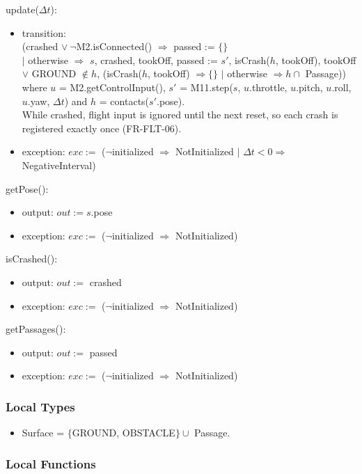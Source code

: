 \documentclass[12pt, titlepage]{article}
\newcommand{\noinit}{$\neg$initialized $\Rightarrow$ NotInitialized}
\begin{document}
\noindent update($\Delta t$):
\begin{itemize}
\item transition: \\
  (crashed $\vee\ \neg$M2.isConnected() $\Rightarrow$ passed := $\{\}$ \\
  $|$ otherwise $\Rightarrow$ $s$, crashed, tookOff, passed := $s'$,
  isCrash($h$, tookOff), tookOff $\vee$ GROUND $\notin h$, (isCrash($h$,
  tookOff) $\Rightarrow \{\}$ $|$ otherwise $\Rightarrow h \cap$ Passage)) \\
  where $u$ = M2.getControlInput(), $s'$ = M11.step($s$, $u$.throttle,
  $u$.pitch, $u$.roll, $u$.yaw, $\Delta t$) and $h$ = contacts($s'$.pose). \\
  While crashed, flight input is ignored until the next reset, so each crash is
  registered exactly once (FR-FLT-06).
\item exception: $exc :=$ (\noinit{} $|$ $\Delta t < 0 \Rightarrow$
  NegativeInterval)
\end{itemize}

\noindent getPose():
\begin{itemize}
\item output: $out := s$.pose
\item exception: $exc :=$ (\noinit)
\end{itemize}

\noindent isCrashed():
\begin{itemize}
\item output: $out :=$ crashed
\item exception: $exc :=$ (\noinit)
\end{itemize}

\noindent getPassages():
\begin{itemize}
\item output: $out :=$ passed
\item exception: $exc :=$ (\noinit)
\end{itemize}

\subsubsection{Local Types}

\begin{itemize}
\item Surface = $\{$GROUND, OBSTACLE$\} \cup$ Passage.
\end{itemize}

\subsubsection{Local Functions}
\end{document}
